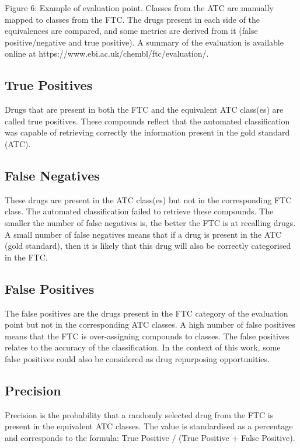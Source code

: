 \documentclass{bioinfo}
\begin{document}
Figure 6: Example of evaluation point. Classes from the ATC are manually 
mapped to classes from the FTC. The drugs present in each side of the equivalences 
are compared, and some metrics are derived from it (false positive/negative and true positive). 
A summary of the evaluation is available online at {{https://www.ebi.ac.uk/chembl/ftc/evaluation/}}.

\subsection{True Positives}
Drugs that are present in both the FTC and the equivalent ATC class(es) are called true positives. 
These compounds reflect that the automated classification was capable of retrieving correctly the 
information present in the gold standard (ATC).

\subsection{False Negatives}
These drugs are present in the ATC class(es) but not in the corresponding FTC class. 
The automated classification failed to retrieve these compounds. The smaller the number of 
false negatives is, the better the FTC is at recalling drugs. A small number of false negatives 
means that if a drug is present in the ATC (gold standard), then it is likely that this drug will 
also be correctly categorised in the FTC.

\subsection{False Positives}
The false positives are the drugs present in the FTC category of the evaluation point but not in the corresponding ATC classes. 
A high number of false positives means that the FTC is over-assigning compounds to classes.
The false positives relates to the accuracy of the classification. In the context of this work, 
some false positives could also be considered as drug repurposing opportunities.

\subsection{Precision}
Precision is the probability that a randomly selected drug from the FTC is present in the equivalent ATC classes. 
The value is standardised as a percentage and corresponds to the formula: True Positive / (True Positive + False Positive).
\end{document}
